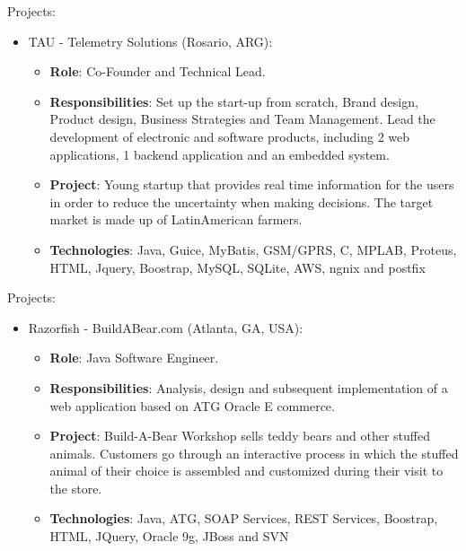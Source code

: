 \documentclass[11pt,a4paper,sans]{moderncv}        %
\begin{document}
  {
    Projects:\\
    \begin{itemize}
      \item TAU - Telemetry Solutions (Rosario, ARG):
        \begin{itemize}
          \item \textbf{Role}: Co-Founder and Technical Lead. 
          \item \textbf{Responsibilities}: Set up the start-up from scratch, Brand design, Product design, Business Strategies and Team Management. Lead the development of electronic and software products, including 2 web applications, 1 backend application and an embedded system. 
          \item \textbf{Project}: Young startup that provides real time information for the users in order to reduce the uncertainty when making decisions. The target market is made up of LatinAmerican farmers.
          \item \textbf{Technologies}: Java, Guice, MyBatis, GSM/GPRS, C, MPLAB, Proteus, HTML, Jquery, Boostrap, MySQL, SQLite, AWS, ngnix and postfix
        \end{itemize}
    \end{itemize}
  }

  {
    Projects:\\
    \begin{itemize}
      \item Razorfish - BuildABear.com (Atlanta, GA, USA):
        \begin{itemize}
          \item \textbf{Role}: Java Software Engineer. 
          \item \textbf{Responsibilities}: Analysis, design and subsequent implementation of a web application based on ATG Oracle E commerce.
          \item \textbf{Project}: Build-A-Bear Workshop sells teddy bears and other stuffed animals. Customers go through an interactive process in which the stuffed animal of their choice is assembled and customized during their visit to the store.
          \item \textbf{Technologies}: Java, ATG, SOAP Services, REST Services, Boostrap, HTML, JQuery, Oracle 9g, JBoss and SVN 
        \end{itemize}
    \end{itemize}
  }
\end{document}
